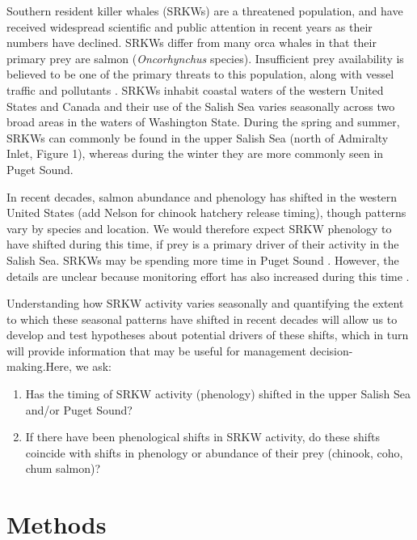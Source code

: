\documentclass{article}
\begin{document}
\par Southern resident killer whales (SRKWs) are a threatened population, and have received widespread scientific and public attention in recent years as their numbers have declined\citep[e.g., seattle times articles,][]{lusseau2009,larson2018, olson2018}. SRKWs differ from many orca whales in that their primary prey are salmon (\emph{Oncorhynchus} species).  Insufficient prey availability is believed to be one of the primary threats to this population, along with vessel traffic and pollutants \citep{krahn2007,lusseau2009,hanson2010}. SRKWs inhabit coastal waters of the western United States and Canada and their use of the Salish Sea varies seasonally across two broad areas in the waters of Washington State. During the spring and summer, SRKWs can commonly be found in the upper Salish Sea (north of Admiralty Inlet, Figure 1), whereas during the winter they are more commonly seen in  Puget Sound.
\par In recent decades, salmon abundance and phenology has shifted in the western United States \citep{weinheimer2017,reed2011,ford2006,satterthwaite2014}(add Nelson for chinook hatchery release timing), though patterns vary by species and location. We would therefore expect SRKW phenology to have shifted during this time, if prey is a primary driver of their activity in the Salish Sea. SRKWs may be spending more time in Puget Sound \citep{olson2018}. However, the details are unclear because monitoring effort has also increased during this time \citep{olson2018, strebel2014}. 
\par Understanding how SRKW activity varies seasonally and quantifying the extent to which these seasonal patterns have shifted in recent decades will allow us to develop and test hypotheses about potential drivers of these shifts, which in turn will provide information that may be useful for management decision-making.Here, we ask:
\begin{enumerate}
\item Has the timing of SRKW activity (phenology) shifted in the upper Salish Sea and/or Puget Sound? 
\item If there have been phenological shifts in SRKW activity, do these shifts coincide with shifts in phenology or abundance of their prey (chinook, coho, chum salmon)?
\end{enumerate}


\section* {Methods}
\end{document}
